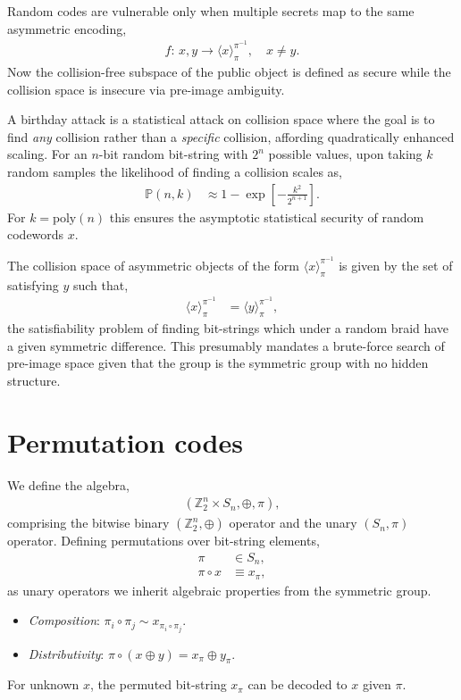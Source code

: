 \documentclass[twocolumn, aps, amsmath, amssymb, nofootinbib, superscriptaddress, longbibliography, doublefloatfix, table-of-contents, eqsecnum, rmp]{revtex4-2}
\def\selfbraid#1#2#3{\langle#1\rangle_{#2}^{#3}}
\begin{document}
Random codes are vulnerable only when multiple secrets map to the same asymmetric encoding,
\begin{align}
	f:\, x,y \to \selfbraid{x}{\pi}{\pi^{-1}},\quad x\neq y.
\end{align}
Now the collision-free subspace of the public object is defined as secure while the collision space is insecure via pre-image ambiguity.

A birthday attack is a statistical attack on collision space where the goal is to find \emph{any} collision rather than a \emph{specific} collision, affording quadratically enhanced scaling. For an $n$-bit random bit-string with $2^n$ possible values, upon taking $k$ random samples the likelihood of finding a collision scales as,
\begin{align}
	\mathbb{P}(n,k) &\approx 1 - \exp\left[-\frac{k^2}{2^{n+1}}\right].
\end{align}
For $k=\mathrm{poly}(n)$ this ensures the asymptotic statistical security of random codewords $x$.

The collision space of asymmetric objects of the form $\selfbraid{x}{\pi}{\pi^{-1}}$ is given by the set of satisfying $y$ such that,
\begin{align}
	\selfbraid{x}{\pi}{\pi^{-1}} &= \selfbraid{y}{\pi}{\pi^{-1}},
\end{align}
the satisfiability problem of finding bit-strings which under a random braid have a given symmetric difference. This presumably mandates a brute-force search of pre-image space given that the group is the symmetric group with no hidden structure.


\section{Permutation codes}

We define the algebra,
\begin{align}
	(\mathbb{Z}_2^n \times S_n, \oplus,\pi),
\end{align}
comprising the bitwise binary $(\mathbb{Z}_2^n,\oplus)$ operator and the unary $(S_n,\pi)$ operator. Defining permutations over bit-string elements,
\begin{align}
	\pi &\in S_n,\nonumber\\
	\pi\circ x &\equiv x_\pi,
\end{align}
as unary operators we inherit algebraic properties from the symmetric group.
\begin{itemize}
	\item \emph{Composition}: $\pi_i \circ \pi_j \sim x_{\pi_i\circ \pi_j}$.
	\item \emph{Distributivity}: $\pi\circ(x\oplus y) = x_\pi \oplus y_\pi$.
\end{itemize}
For unknown $x$, the permuted bit-string $x_\pi$ can be decoded to $x$ given $\pi$.
\end{document}
